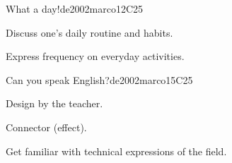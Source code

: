 \begin{syllabus}
\begin{unit}{What a day!}{}{de2002marco}{12}{C25}
   \begin{learningoutcomes}
      \item Discuss one’s daily routine and habits.
      \item Express frequency on everyday activities.
   \end{learningoutcomes}
\end{unit}

\begin{unit}{Can you speak English?}{}{de2002marco}{15}{C25}
   \begin{topics}
      \item Design by the teacher.
      \item Connector (effect).
   \end{topics}

   \begin{learningoutcomes}
      \item Get familiar with technical expressions of the field.
   \end{learningoutcomes}
\end{unit}

\begin{coursebibliography}
\end{coursebibliography}

\end{syllabus}
%
